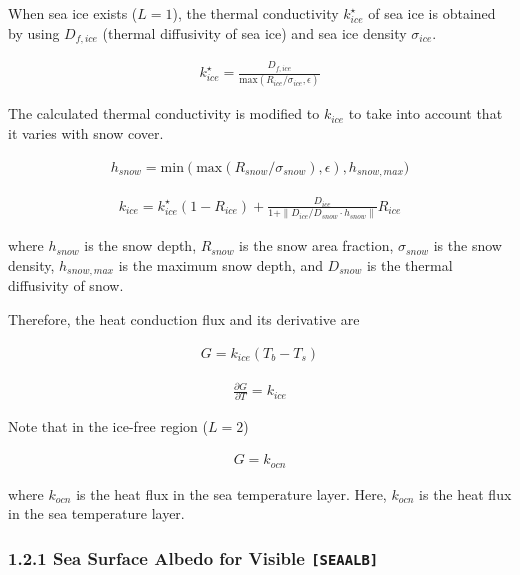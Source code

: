 When sea ice exists (\(L=1\)), the thermal conductivity
\(k_{ice}^\star\) of sea ice is obtained by using \(D_{f,ice}\) (thermal
diffusivity of sea ice) and sea ice density \(\sigma_{ice}\).

\begin{eqnarray}
k_{ice}^\star = \frac{D_{f,ice}}{\mathrm{max}(R_{ice}/\sigma_{ice}, \epsilon)}
\end{eqnarray}

The calculated thermal conductivity is modified to \(k_{ice}\) to take
into account that it varies with snow cover.

\begin{eqnarray}
h_{snow} = \mathrm{min}(
    \mathrm{max}(
    R_{snow}/\sigma_{snow}),\epsilon
        ),h_{snow,max}
        )
\end{eqnarray}

\begin{eqnarray}      
k_{ice} = k_{ice}^\star (1-R_{ice}) + \frac{D_{ice}}{1+\| D_{ice}/D_{snow} \cdot h_{snow} \|} R_{ice}
\end{eqnarray}

where \(h_{snow}\) is the snow depth, \(R_{snow}\) is the snow area
fraction, \(\sigma_{snow}\) is the snow density, \(h_{snow,max}\) is the
maximum snow depth, and \(D_{snow}\) is the thermal diffusivity of snow.

Therefore, the heat conduction flux and its derivative are

\begin{eqnarray}
 G = k_{ice} (T_b - T_s)
\end{eqnarray}

\begin{eqnarray}
 \frac{\partial G}{\partial T} = k_{ice}
\end{eqnarray}

Note that in the ice-free region (\(L=2\))

\begin{eqnarray}
G=k_{ocn}
\end{eqnarray}

where \(k_{ocn}\) is the heat flux in the sea temperature layer. Here,
\(k_{ocn}\) is the heat flux in the sea temperature layer.

\hypertarget{sea-surface-albedo-for-visible-seaalb}{%
\subsubsection{\texorpdfstring{1.2.1 Sea Surface Albedo for Visible
\texttt{{[}SEAALB{]}}}{1.2.1 Sea Surface Albedo for Visible {[}SEAALB{]}}}\label{sea-surface-albedo-for-visible-seaalb}}

